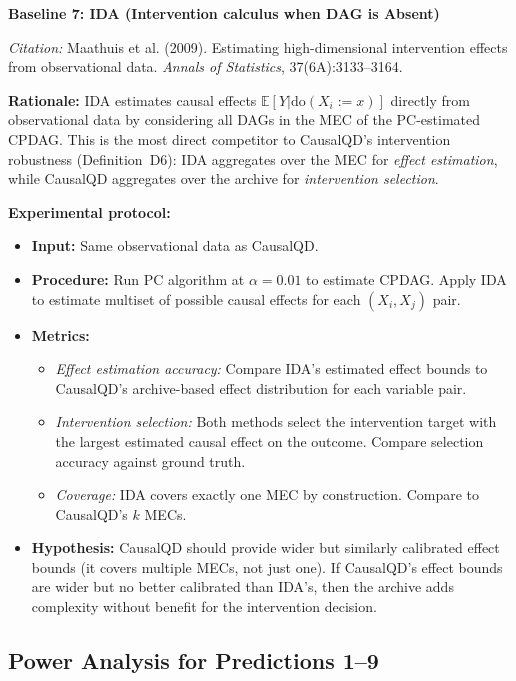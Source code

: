 \documentclass{article}
\theoremstyle{definition}
\theoremstyle{plain}
\theoremstyle{remark}
\begin{document}
\textbf{Baseline 7: IDA (Intervention calculus when DAG is Absent)}

\emph{Citation:} Maathuis et al. (2009). Estimating high-dimensional intervention
effects from observational data. \emph{Annals of Statistics}, 37(6A):3133--3164.

\textbf{Rationale:} IDA estimates causal effects $\mathbb{E}[Y | \text{do}(X_i := x)]$
directly from observational data by considering all DAGs in the MEC of the PC-estimated
CPDAG. This is the most direct competitor to CausalQD's intervention robustness
(Definition~D6): IDA aggregates over the MEC for \emph{effect estimation}, while
CausalQD aggregates over the archive for \emph{intervention selection}.

\textbf{Experimental protocol:}
\begin{itemize}
  \item \textbf{Input:} Same observational data as CausalQD.
  \item \textbf{Procedure:} Run PC algorithm at $\alpha = 0.01$ to estimate CPDAG.
    Apply IDA to estimate multiset of possible causal effects for each $(X_i, X_j)$ pair.
  \item \textbf{Metrics:}
    \begin{itemize}
      \item \emph{Effect estimation accuracy:} Compare IDA's estimated effect bounds
        to CausalQD's archive-based effect distribution for each variable pair.
      \item \emph{Intervention selection:} Both methods select the intervention target
        with the largest estimated causal effect on the outcome. Compare selection
        accuracy against ground truth.
      \item \emph{Coverage:} IDA covers exactly one MEC by construction. Compare to
        CausalQD's $k$ MECs.
    \end{itemize}
  \item \textbf{Hypothesis:} CausalQD should provide wider but similarly calibrated
    effect bounds (it covers multiple MECs, not just one). If CausalQD's effect
    bounds are wider but no better calibrated than IDA's, then the archive adds
    complexity without benefit for the intervention decision.
\end{itemize}


\subsection*{Power Analysis for Predictions 1--9}
\end{document}
